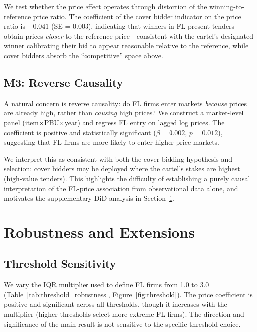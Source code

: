 \documentclass[12pt]{elsarticle}
\begin{document}
We test whether the price effect operates through distortion of the winning-to-reference price ratio. The coefficient of the cover bidder indicator on the price ratio is $-0.041$ (SE = 0.003), indicating that winners in FL-present tenders obtain prices \textit{closer} to the reference price---consistent with the cartel's designated winner calibrating their bid to appear reasonable relative to the reference, while cover bidders absorb the ``competitive'' space above.

\subsection{M3: Reverse Causality}

A natural concern is reverse causality: do FL firms enter markets \textit{because} prices are already high, rather than \textit{causing} high prices? We construct a market-level panel (item$\times$PBU$\times$year) and regress FL entry on lagged log prices. The coefficient is positive and statistically significant ($\beta = 0.002$, $p = 0.012$), suggesting that FL firms are more likely to enter higher-price markets.

We interpret this as consistent with both the cover bidding hypothesis and selection: cover bidders may be deployed where the cartel's stakes are highest (high-value tenders). This highlights the difficulty of establishing a purely causal interpretation of the FL-price association from observational data alone, and motivates the supplementary DiD analysis in Section~\ref{sec:robustness}.



\section{Robustness and Extensions}
\label{sec:robustness}

\subsection{Threshold Sensitivity}

We vary the IQR multiplier used to define FL firms from 1.0 to 3.0 (Table~\ref{tab:threshold_robustness}, Figure~\ref{fig:threshold}). The price coefficient is positive and significant across all thresholds, though it increases with the multiplier (higher thresholds select more extreme FL firms). The direction and significance of the main result is not sensitive to the specific threshold choice.
\end{document}
